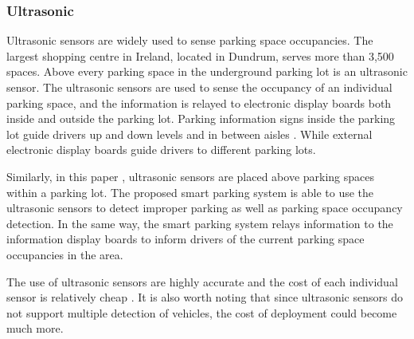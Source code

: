 \subsubsection*{Ultrasonic}
Ultrasonic sensors are widely used to sense parking space occupancies. The largest shopping centre in Ireland, located in Dundrum, serves more than 3,500 spaces. Above every parking space in the underground parking lot is an ultrasonic sensor. The ultrasonic sensors are used to sense the occupancy of an individual parking space, and the information is relayed to electronic display boards both inside and outside the parking lot. Parking information signs inside the parking lot guide drivers up and down levels and in between aisles \citep{2008Bay-SpecificCentre}. While external electronic display boards guide drivers to different parking lots.

Similarly, in this paper \citep{Kianpisheh2012SmartDetector}, ultrasonic sensors are placed above parking spaces within a parking lot. The proposed smart parking system is able to use the ultrasonic sensors to detect improper parking as well as parking space occupancy detection. In the same way, the smart parking system relays information to the information display boards to inform drivers of the current parking space occupancies in the area.

The use of ultrasonic sensors are highly accurate and the cost of each individual sensor is relatively cheap \citep{dokur_embedded_2016}. It is also worth noting that since ultrasonic sensors do not support multiple detection of vehicles, the cost of deployment could become much more.
